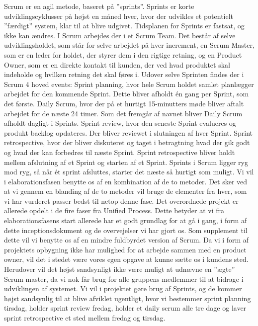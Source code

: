 Scrum er en agil metode, baseret på ”sprints”. Sprints er korte udviklingscyklusser på højst en måned hver, hvor der udvikles et potentielt ”færdigt” system, klar til at blive udgivet. Tidsplanen for Sprints er fastsat, og ikke kan ændres. I Scrum arbejdes der i et Scrum Team. Det består af selve udviklingsholdet, som står for selve arbejdet på hver increment, en Scrum Master, som er en leder for holdet, der styrer dem i den rigtige retning, og en Product Owner, som er en direkte kontakt til kunden, der ved hvad produktet skal indeholde og hvilken retning det skal føres i.
Udover selve Sprinten findes der i Scrum 4 hoved events:
Sprint planning, hvor hele Scrum holdet samlet planlægger arbejdet for den kommende Sprint. Dette bliver afholdt én gang per Sprint, som det første.
Daily Scrum, hvor der på et hurtigt 15-minutters møde bliver aftalt arbejdet for de næste 24 timer. Som det fremgår af navnet bliver Daily Scrum afholdt dagligt i Sprints.
Sprint review, hvor den seneste Sprint evalueres og produkt backlog opdateres. Der bliver reviewet i slutningen af hver Sprint.
Sprint retrospective, hvor der bliver diskuteret og taget i betragtning hvad der gik godt og hvad der kan forbedres til næste Sprint. Sprint retrospective bliver holdt mellem afslutning af et Sprint og starten af et Sprint.
Sprints i Scrum ligger ryg mod ryg, så når ét sprint afsluttes, starter det næste så hurtigt som muligt.
Vi vil i elaborationsfasen benytte os af en kombination af de to metoder. Det sker ved at vi gennem en blanding af de to metoder vil bruge de elementer fra hver, som vi har vurderet passer bedst til netop denne fase. Det overordnede projekt er allerede opdelt i de fire faser fra Unified Process. Dette betyder at vi fra elaborationsfasens start allerede har et godt grundlag for at gå i gang, i form af dette inceptionsdokument og de overvejelser vi har gjort os.
Som supplement til dette vil vi benytte os af en mindre fuldbyrdet version af Scrum. Da vi i form af projektets opbygning ikke har mulighed for at arbejde sammen med en product owner, vil det i stedet være vores egen opgave at kunne sætte os i kundens sted. Herudover vil det højst sandsynligt ikke være muligt at udnævne en ”ægte” Scrum master, da vi nok får brug for alle gruppens medlemmer til at bidrage i udviklingen af systemet. Vi vil i projektet gøre brug af Sprints, og de kommer højst sandsynlig til at blive afviklet ugentligt, hvor vi bestemmer sprint planning tirsdag, holder sprint review fredag, holder et daily scrum alle tre dage og laver sprint retrospective et sted mellem fredag og tirsdag.
